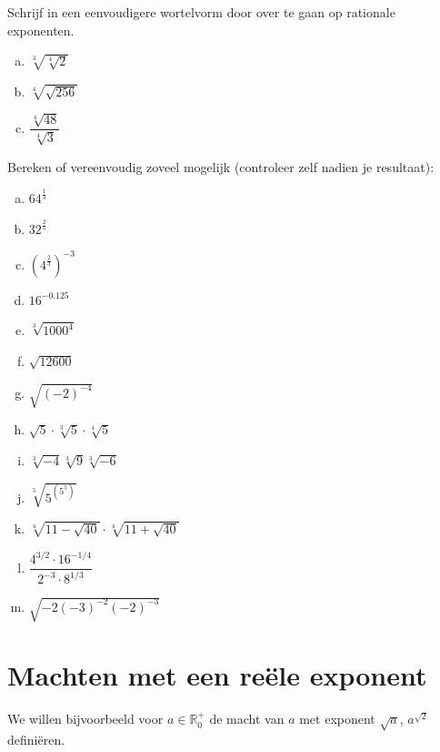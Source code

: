 \documentclass[12pt,twoside,a4paper]{article}
\begin{document}
\begin{oefening}
Schrijf in een eenvoudigere wortelvorm door over te gaan op rationale exponenten.
\begin{multicols}{2}
\begin{enumerate}[(a)]
  \itemsep1em
  \item $\sqrt[3]{\sqrt[4]{2}}$
  \item $\sqrt[4]{\sqrt{256}}$
  \item $\dfrac{\sqrt[4]{48}}{\sqrt[4]{3}}$
\end{enumerate}
\end{multicols}
\end{oefening}

\begin{oefening}
Bereken of vereenvoudig zoveel mogelijk (controleer zelf nadien je resultaat):
\begin{multicols}{3}
\begin{enumerate}[(a)]
  \itemsep1em
  \item $64^{\frac{1}{3}}$
  \item $32^{\frac{2}{5}}$
  \item $\left(4^{\frac{2}{3}}\right)^{-3}$
  \item $16^{-0.125}$
  \item $\sqrt[3]{1000^4}$
  \item $\sqrt{12600}$
  \item $\sqrt{\left(-2\right)^{-4}}$
  \item $\sqrt{5}\cdot\sqrt[3]{5}\cdot\sqrt[4]{5}$
  \item $\sqrt[3]{-4}\sqrt[3]{9}\sqrt[3]{-6}$
  \item $\sqrt[5]{5^{(5^5)}}$
  \item $\sqrt[4]{11-\sqrt{40}}\cdot\sqrt[4]{11+\sqrt{40}}$
  \item $\dfrac{4^{3/2}\cdot 16^{-1/4}}{2^{-3}\cdot 8^{1/3}}$
  \item $\sqrt{-2(-3)^{-2}(-2)^{-3}}$
\end{enumerate}
\end{multicols}
\end{oefening}

\pagebreak
\section{Machten met een reële exponent}

We willen bijvoorbeeld voor $a\in\mathbb{R}_0^+$ de macht van $a$ met exponent $\sqrt{a}$, $a^{\sqrt{2}}$ definiëren.
\end{document}
